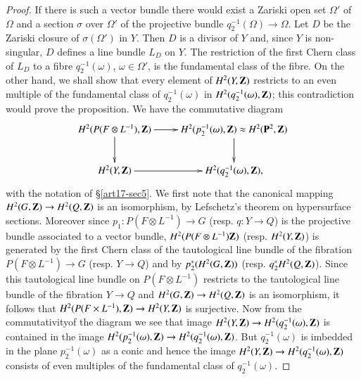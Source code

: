 \begin{proof}
If there is such a vector bundle there would exist a Zariski open set $\Omega'$ of $\Omega$ and a section $\sigma$ over $\Omega'$ of the projective bundle $q^{-1}_{2}(\Omega)\to \Omega$. Let $D$ be the Zariski closure of $\sigma(\Omega')$ in $Y$. Then $D$ is a divisor of $Y$ and, since $Y$ is non-singular, $D$ defines a line bundle $L_{D}$ on $Y$. The restriction of the first Chern class of $L_{D}$ to a fibre $q^{-1}_{2}(\omega)$, $\omega\in \Omega'$, is the fundamental class of the fibre. On the other hand, we shall show that every element of $H^{2}(Y,\mathbf{Z})$ restricts to an even multiple of the fundamental class of $q^{-1}_{2}(\omega)$ in $H^{2}(q^{-1}_{2}(\omega),\mathbf{Z})$; this contradiction would prove the proposition. We have the commutative diagram
\[
\xymatrix{
H^{2}(P(F\otimes L^{-1}),\bfZ)\ar[d]\ar[r] & H^{2}(p^{-1}_{2}(\omega),\bfZ)\approx H^{2}(\bfP^{2},\bfZ)\ar[d]\\
H^{2}(Y,\bfZ)\ar[r] & H^{2}(q^{-1}_{2}(\omega),\bfZ),
}
\]
with the notation of \S\ref{art17-sec5}. We first note that the canonical mapping $H^{2}(G,\mathbf{Z})\to H^{2}(Q,\mathbf{Z})$ is an isomorphism, by Lefschetz's theorem on hypersurface sections. Moreover since $p_{1}:P(F\otimes L^{-1})\to G$ (resp. $q:Y\to Q$) is the projective bundle associated to a vector bundle, $H^{2}(P(F\otimes L^{-1})\mathbf{Z})$ (resp. $H^{2}(Y,\mathbf{Z})$) is generated by the first Chern class of the tautological line bundle of the fibration $P(F\otimes L^{-1})\to G$ (resp. $Y\to Q$) and by $p^{*}_{2}(H^{2}(G,\mathbf{Z}))$ (resp. $q^{*}_{2}H^{2}(Q,\mathbf{Z})$). Since this tautological line bundle on $P(F\otimes L^{-1})$ restricts to the tautological line bundle of the fibration $Y\to Q$ and $H^{2}(G,\mathbf{Z})\to H^{2}(Q,\mathbf{Z})$ is an isomorphism, it follows that $H^{2}(P(F\times L^{-1}),\mathbf{Z})\to H^{2}(Y,\mathbf{Z})$ is surjective. Now from the commutativity\pageoriginale of the diagram we see that image $H^{2}(Y,\mathbf{Z})\to H^{2}(q^{-1}_{2}(\omega),\mathbf{Z})$ is contained in the image $H^{2}(p^{-1}_{2}(\omega),\mathbf{Z})\to H^{2}(q^{-1}_{2}(\omega),\mathbf{Z})$. But $q^{-1}_{2}(\omega)$ is imbedded in the plane $p^{-1}_{2}(\omega)$ as a conic and hence the image $H^{2}(Y,\mathbf{Z})\to H^{2}(q^{-1}_{2}(\omega),\mathbf{Z})$ consists of even multiples of the fundamental class of $q^{-1}_{2}(\omega)$.
\end{proof}

